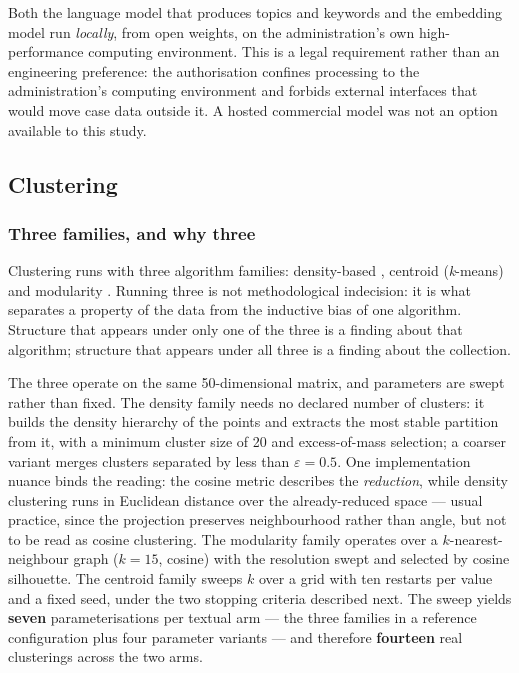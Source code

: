 Both the language model that produces topics and keywords and the embedding model run
\emph{locally}, from open weights, on the administration's own high-performance computing
environment. This is a legal requirement rather than an engineering preference: the
authorisation confines processing to the administration's computing environment and forbids
external interfaces that would move case data outside it. A hosted commercial model was not an
option available to this study.

\subsection{Clustering}\label{sec:clustering}

\subsubsection{Three families, and why three}\label{sec:families}

Clustering runs with three algorithm families: density-based
\citep{campello2013hdbscan, mcinnes2017hdbscan}, centroid (\textit{k}-means) and modularity
\citep{traag2019leiden}. Running three is not methodological indecision: it is what separates a
property of the data from the inductive bias of one algorithm. Structure that appears under only
one of the three is a finding about that algorithm; structure that appears under all three is a
finding about the collection.

The three operate on the same 50-dimensional matrix, and parameters are swept rather than fixed.
The density family needs no declared number of clusters: it builds the density hierarchy of the
points and extracts the most stable partition from it, with a minimum cluster size of 20 and
excess-of-mass selection; a coarser variant merges clusters separated by less than
$\varepsilon = 0.5$. One implementation nuance binds the reading: the cosine metric describes the
\emph{reduction}, while density clustering runs in Euclidean distance over the already-reduced
space --- usual practice, since the projection preserves neighbourhood rather than angle, but not
to be read as cosine clustering. The modularity family operates over a $k$-nearest-neighbour
graph ($k = 15$, cosine) with the resolution swept and selected by cosine silhouette. The
centroid family sweeps $k$ over a grid with ten restarts per value and a fixed seed, under the
two stopping criteria described next. The sweep yields \textbf{seven} parameterisations per
textual arm --- the three families in a reference configuration plus four parameter variants ---
and therefore \textbf{fourteen} real clusterings across the two arms.

